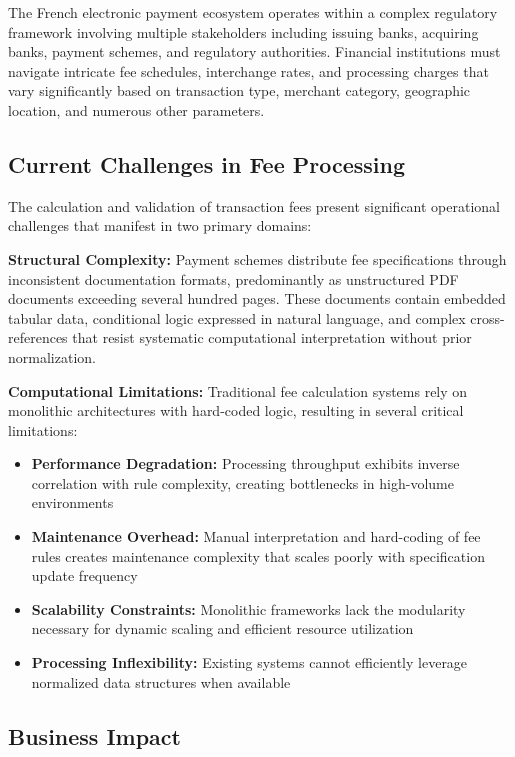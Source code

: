 The French electronic payment ecosystem operates within a complex regulatory framework involving multiple stakeholders including issuing banks, acquiring banks, payment schemes, and regulatory authorities. Financial institutions must navigate intricate fee schedules, interchange rates, and processing charges that vary significantly based on transaction type, merchant category, geographic location, and numerous other parameters.

\subsection{Current Challenges in Fee Processing}

The calculation and validation of transaction fees present significant operational challenges that manifest in two primary domains:

\textbf{Structural Complexity:} Payment schemes distribute fee specifications through inconsistent documentation formats, predominantly as unstructured PDF documents exceeding several hundred pages. These documents contain embedded tabular data, conditional logic expressed in natural language, and complex cross-references that resist systematic computational interpretation without prior normalization.

\textbf{Computational Limitations:} Traditional fee calculation systems rely on monolithic architectures with hard-coded logic, resulting in several critical limitations:

\begin{itemize}
   \item \textbf{Performance Degradation:} Processing throughput exhibits inverse correlation with rule complexity, creating bottlenecks in high-volume environments
   \item \textbf{Maintenance Overhead:} Manual interpretation and hard-coding of fee rules creates maintenance complexity that scales poorly with specification update frequency
   \item \textbf{Scalability Constraints:} Monolithic frameworks lack the modularity necessary for dynamic scaling and efficient resource utilization
   \item \textbf{Processing Inflexibility:} Existing systems cannot efficiently leverage normalized data structures when available
\end{itemize}

\subsection{Business Impact}

